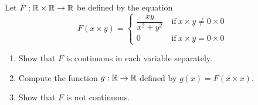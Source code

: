 \documentclass[a4paper, 12pt]{article}
\begin{document}
\begin{problem} 
Let $F: \mathbb{R} \times \mathbb{R} \to \mathbb{R}$ be defined by the equation \begin{equation*}
F(x \times y) = \begin{cases}
\dfrac{xy}{x^2 + y^2} & \:\text{if}\: x \times y \neq 0 \times 0 \\
0 & \:\text{if}\: x \times y = 0 \times 0
\end{cases}
\end{equation*}
\begin{enumerate}
\item Show that $F$ is continuous in each variable separately.
\item Compute the function $g: \mathbb{R} \to \mathbb{R}$ defined by $g(x) = F(x \times x)$.
\item Show that $F$ is not continuous.
\end{enumerate}
\end{problem}
\end{document}
